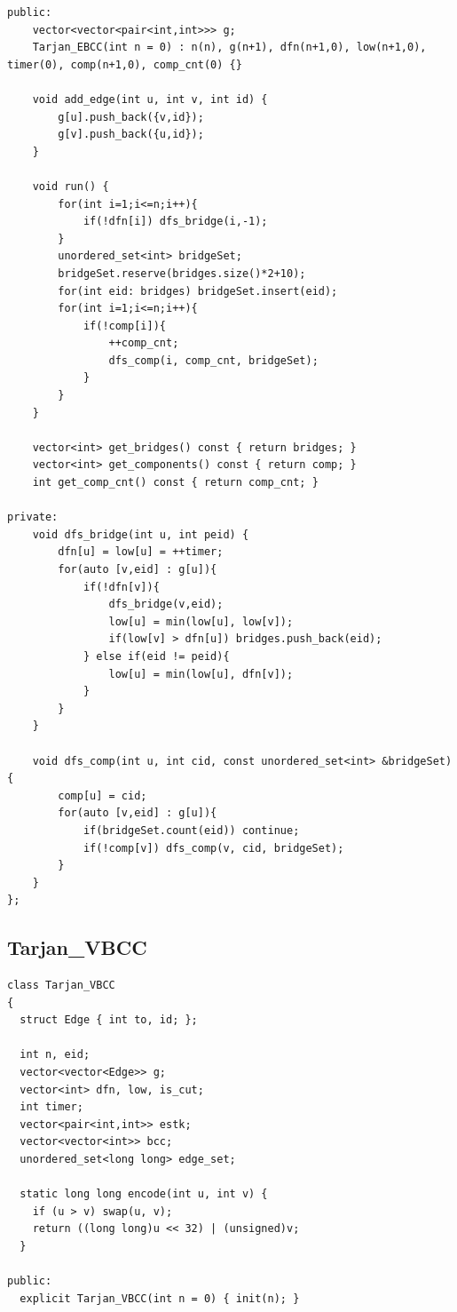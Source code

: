 \documentclass[10pt]{article}
\begin{document}
\begin{multicols*}{2}
\begin{verbatim}
public:
    vector<vector<pair<int,int>>> g;
    Tarjan_EBCC(int n = 0) : n(n), g(n+1), dfn(n+1,0), low(n+1,0), timer(0), comp(n+1,0), comp_cnt(0) {}

    void add_edge(int u, int v, int id) {
        g[u].push_back({v,id});
        g[v].push_back({u,id});
    }

    void run() {
        for(int i=1;i<=n;i++){
            if(!dfn[i]) dfs_bridge(i,-1);
        }
        unordered_set<int> bridgeSet;
        bridgeSet.reserve(bridges.size()*2+10);
        for(int eid: bridges) bridgeSet.insert(eid);
        for(int i=1;i<=n;i++){
            if(!comp[i]){
                ++comp_cnt;
                dfs_comp(i, comp_cnt, bridgeSet);
            }
        }
    }

    vector<int> get_bridges() const { return bridges; }
    vector<int> get_components() const { return comp; }
    int get_comp_cnt() const { return comp_cnt; }

private:
    void dfs_bridge(int u, int peid) {
        dfn[u] = low[u] = ++timer;
        for(auto [v,eid] : g[u]){
            if(!dfn[v]){
                dfs_bridge(v,eid);
                low[u] = min(low[u], low[v]);
                if(low[v] > dfn[u]) bridges.push_back(eid);
            } else if(eid != peid){
                low[u] = min(low[u], dfn[v]);
            }
        }
    }

    void dfs_comp(int u, int cid, const unordered_set<int> &bridgeSet) {
        comp[u] = cid;
        for(auto [v,eid] : g[u]){
            if(bridgeSet.count(eid)) continue;
            if(!comp[v]) dfs_comp(v, cid, bridgeSet);
        }
    }
};
\end{verbatim}


\subsection{Tarjan\_VBCC}


\begin{verbatim}
class Tarjan_VBCC
{
  struct Edge { int to, id; };

  int n, eid;
  vector<vector<Edge>> g;
  vector<int> dfn, low, is_cut;
  int timer;
  vector<pair<int,int>> estk;
  vector<vector<int>> bcc;
  unordered_set<long long> edge_set;

  static long long encode(int u, int v) {
    if (u > v) swap(u, v);
    return ((long long)u << 32) | (unsigned)v;
  }

public:
  explicit Tarjan_VBCC(int n = 0) { init(n); }


\end{verbatim}
\end{multicols*}
\end{document}
